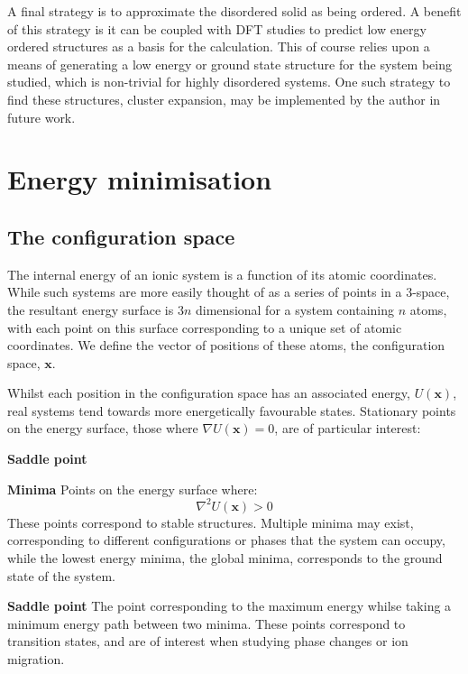 A final strategy is to approximate the disordered solid as being ordered.
A benefit of this strategy is it can be coupled with DFT studies to predict low energy ordered structures as a basis for the calculation.
This of course relies upon a means of generating a low energy or ground state structure for the system being studied, which is non-trivial for highly disordered systems.
One such strategy to find these structures, cluster expansion,\cite{Chang2019} may be implemented by the author in future work.


\section{Energy minimisation}
\label{sec:minimization}
\subsection{The configuration space}
\label{sec:config}
The internal energy of an ionic system is a function of its atomic coordinates.
While such systems are more easily thought of as a series of points in a 3-space, the resultant energy surface is $3n$ dimensional for a system containing $n$ atoms, with each point on this surface corresponding to a unique set of atomic coordinates.
We define the vector of positions of these atoms, the configuration space, $\mathbf{x}$.

Whilst each position in the configuration space has an associated energy, $U(\mathbf{x})$, real systems tend towards more energetically favourable states.
Stationary points on the energy surface, those where $\nabla U(\mathbf{x}) = 0$, are of particular interest:
\begin{labeling}{\textbf{Saddle point}}
	\item [\textbf{Minima}] Points on the energy surface where:
	\begin{equation}
	\nabla^2 U(\mathbf{x}) > 0
	\end{equation}
	\noindent
	These points correspond to stable structures.
	Multiple minima may exist, corresponding to different configurations or phases that the system can occupy, while the lowest energy minima, the global minima, corresponds to the ground state of the system.
	\item [\textbf{Saddle point}] The point corresponding to the maximum energy whilse taking a minimum energy path between two minima.
	These points correspond to transition states, and are of interest when studying phase changes or ion migration.
\end{labeling}

